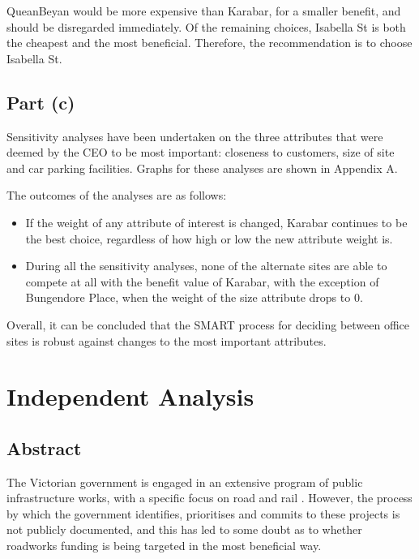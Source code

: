 \documentclass[11pt, a4paper]{article}
\begin{document}
    QueanBeyan would be more expensive than Karabar, for a smaller benefit, and should be disregarded immediately. Of the remaining choices, Isabella St is both the cheapest and the most beneficial. Therefore, the recommendation is to choose Isabella St.

    \subsection*{Part (c)}

    Sensitivity analyses have been undertaken on the three attributes that were deemed by the CEO to be most important: closeness to customers, size of site and car parking facilities. Graphs for these analyses are shown in Appendix A.

    The outcomes of the analyses are as follows:

    \begin{itemize}
        \item If the weight of any attribute of interest is changed, Karabar continues to be the best choice, regardless of how high or low the new attribute weight is.
        \item During all the sensitivity analyses, none of the alternate sites are able to compete at all with the benefit value of Karabar, with the exception of Bungendore Place, when the weight of the size attribute drops to 0.
    \end{itemize}

    Overall, it can be concluded that the SMART process for deciding between office sites is robust against changes to the most important attributes.

    \section{Independent Analysis}
        
    \subsection{Abstract}

    The Victorian government is engaged in an extensive program of public infrastructure works, with a specific focus on road and rail \parencite{a1}. However, the process by which the government identifies, prioritises and commits to these projects is not publicly documented, and this has led to some doubt as to whether roadworks funding is being targeted in the most beneficial way. 
\end{document}

